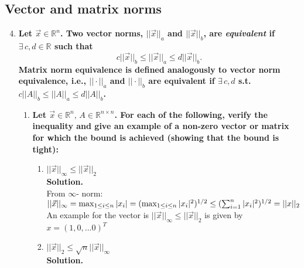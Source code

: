 \documentclass[12pt, oneside]{article}   	%
\begin{document}
\subsection*{Vector and matrix norms}
\vspace{1cm}
\begin{enumerate}
\setcounter{enumi}{3}

\item \textbf{Let $\vec{x} \in \mathbb{R}^n$. Two vector norms, $||\vec{x}||_a$ and $||\vec{x}||_b$, are \emph{equivalent} if
$\exists \, c,d \in \mathbb{R}$ such that
$$c||\vec{x}||_b \leq ||\vec{x}||_a \leq d||\vec{x}||_b.$$
Matrix norm equivalence is defined analogously to vector norm equivalence, i.e., $||\cdot||_a$ and $||\cdot||_b$ are
equivalent if $\exists \, c,d$ s.t. $c||A||_b \leq ||A||_a \leq d||A||_b$.}
\begin{enumerate}
	\item \textbf{Let $\vec{x} \in \mathbb{R}^n, \, A \in \mathbb{R}^{n \times n}$.  For each of the following, verify the inequality and give an example of a non-zero vector or matrix for which the
	bound is achieved (showing that the bound is tight):}\\
	\vspace{1cm}

	\begin{enumerate}
		
		\item$||\vec{x}||_\infty \leq ||\vec{x}||_2$\\
		
		\textbf{Solution.}\\
		
		From $\infty$- norm:\\
		$||\vec{x}||_\infty
		= \max_{1\leq i \leq n} |x_i|\\
		= (\max_{1\leq i \leq n} |x_i|^2)^{1/2} \\
		\leq  (\sum_{i=1}^{n} |x_i|^2)^{1/2}\\
		=||x||_2 $\\
		
		An example for the vector is $||\vec{x}||_\infty \leq ||\vec{x}||_2$ is given by $x = (1,0,...0)^T$\\
		
		
		\item $||\vec{x}||_2 \leq \sqrt{n} ||\vec{x}||_\infty$\\
		
		\textbf{Solution.}\\
		

\end{enumerate}
\end{enumerate}
\end{enumerate}
\end{document}
